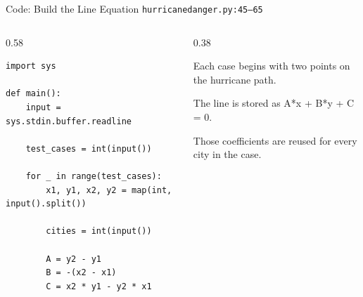\documentclass[aspectratio=169,11pt]{beamer}
\begin{document}
\begin{frame}[fragile]{Code: Build the Line Equation}
\scriptsize
{} \texttt{hurricanedanger.py:45--65}

\vspace{0.08cm}
\begin{columns}[T,totalwidth=\textwidth]
\begin{column}{0.58\textwidth}
\begin{lstlisting}[style=cpcode]
import sys

def main():
    input = sys.stdin.buffer.readline

    test_cases = int(input())

    for _ in range(test_cases):
        x1, y1, x2, y2 = map(int, input().split())

        cities = int(input())

        A = y2 - y1
        B = -(x2 - x1)
        C = x2 * y1 - y2 * x1
\end{lstlisting}
\end{column}
\begin{column}{0.38\textwidth}
\begin{tightitemize}
  \item Each case begins with two points on the hurricane path.
  \item The line is stored as A*x + B*y + C = 0.
  \item Those coefficients are reused for every city in the case.
\end{tightitemize}
\end{column}
\end{columns}
\end{frame}
\end{document}
